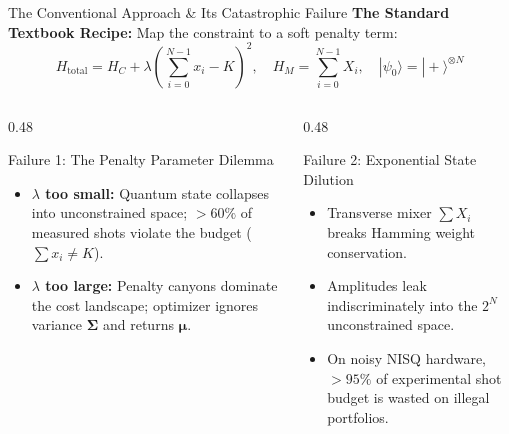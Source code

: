 \documentclass[aspectratio=169,10pt]{beamer}
\begin{document}
\begin{frame}{The Conventional Approach \& Its Catastrophic Failure}
\textbf{The Standard Textbook Recipe:} Map the constraint to a soft penalty term:
\begin{equation*}
H_{\text{total}} = H_C + \lambda \left(\sum_{i=0}^{N-1} x_i - K\right)^2, \quad H_M = \sum_{i=0}^{N-1} X_i, \quad |\psi_0\rangle = |+\rangle^{\otimes N}
\end{equation*}

\vspace{0.3cm}
\begin{columns}
\begin{column}{0.48\textwidth}
\begin{alertblock}{Failure 1: The Penalty Parameter Dilemma}
\begin{itemize}
    \item \textbf{$\lambda$ too small:} Quantum state collapses into unconstrained space; $>60\%$ of measured shots violate the budget ($\sum x_i \neq K$).
    \item \textbf{$\lambda$ too large:} Penalty canyons dominate the cost landscape; optimizer ignores variance $\boldsymbol{\Sigma}$ and returns $\boldsymbol{\mu}$.
\end{itemize}
\end{alertblock}
\end{column}

\begin{column}{0.48\textwidth}
\begin{alertblock}{Failure 2: Exponential State Dilution}
\begin{itemize}
    \item Transverse mixer $\sum X_i$ breaks Hamming weight conservation.
    \item Amplitudes leak indiscriminately into the $2^N$ unconstrained space.
    \item On noisy NISQ hardware, $>95\%$ of experimental shot budget is wasted on illegal portfolios.
\end{itemize}
\end{alertblock}
\end{column}
\end{columns}
\end{frame}
\end{document}
